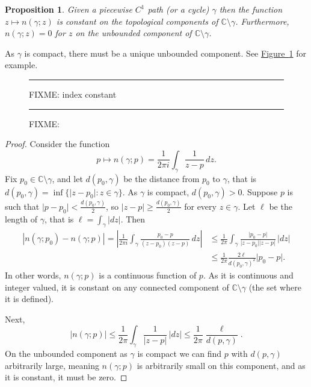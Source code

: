 \documentclass[12pt,openany]{book}
\newcommand{\sabs}[1]{\lvert {#1} \rvert}
\newcommand{\abs}[1]{\left\lvert {#1} \right\rvert}
\newcommand{\C}{{\mathbb{C}}}
\theoremstyle{plain}
\newtheorem{prop}[thm]{Proposition}
\theoremstyle{remark}
\theoremstyle{definition}
\newenvironment{myfig}{%
\begin{figure}[h!t]
\noindent\rule{\textwidth}{0.4pt}\vspace{12pt}\par\centering}%
{\par\noindent\rule{\textwidth}{0.4pt}
\end{figure}}
\theoremstyle{exercise}
\theoremstyle{example}
\newcommand{\figureref}[1]{\hyperref[#1]{Figure~\ref*{#1}}}
\begin{document}
\begin{prop}
Given a piecewise $C^1$ path (or a cycle) $\gamma$ then
the function $z \mapsto n(\gamma;z)$ is constant on the
topological components of $\C \setminus \gamma$.
Furthermore, $n(\gamma;z) = 0$ for $z$ on the unbounded component
of $\C \setminus \gamma$.
\end{prop}

As $\gamma$ is compact, there must be a unique unbounded component.
See \figureref{fig:indexconstant} for example.

\begin{myfig}
FIXME: index constant
\caption{FIXME:\label{fig:indexconstant}}
\end{myfig}

\begin{proof}
Consider the function
\begin{equation}
p \mapsto n(\gamma;p) = \frac{1}{2\pi i} \int_\gamma \frac{1}{z-p} \, dz .
\end{equation}
Fix $p_0 \in \C \setminus \gamma$, and let $d(p_0,\gamma)$ be the distance from 
$p_0$ to $\gamma$, that is $d(p_0,\gamma) = \inf \{ \sabs{z-p_0} : z \in
\gamma \}$.
As $\gamma$ is compact, $d(p_0,\gamma) > 0$.  Suppose $p$ is
such that $\sabs{p-p_0} < \frac{d(p_0,\gamma)}{2}$, so $\sabs{z-p} \geq
\frac{d(p_0,\gamma)}{2}$ for every $z \in \gamma$.  Let $\ell$ be the length of
$\gamma$, that is $\ell = \int_\gamma \sabs{dz}$.  Then
\begin{equation*}
\begin{split}
\abs{n(\gamma;p_0)-n(\gamma;p)}
=
\abs{\frac{1}{2\pi i} \int_\gamma \frac{p_0-p}{(z-p_0)(z-p)} \, dz}
& \leq
\frac{1}{2\pi} \int_\gamma \frac{\sabs{p_0-p}}{\sabs{z-p_0}\sabs{z-p}} \, \sabs{dz}
\\
& \leq 
\frac{1}{2\pi} \frac{2\ell}{{d(p_0,\gamma)}^2} \sabs{p_0-p} .
\end{split}
\end{equation*}
In other words, $n(\gamma;p)$ is a continuous function of $p$.
As it is continuous
and integer valued, it is constant on any connected component of
$\C \setminus \gamma$ (the set where it is defined).

Next,
\begin{equation*}
\sabs{n(\gamma;p)} \leq \frac{1}{2\pi} \int_\gamma \frac{1}{\sabs{z-p}} \,
\sabs{dz} \leq \frac{1}{2\pi} \frac{\ell}{d(p,\gamma)} .
\end{equation*}
On the unbounded component as $\gamma$ is compact we can find $p$
with $d(p,\gamma)$ arbitrarily large, meaning $n(\gamma;p)$ is arbitrarily small
on this component, and as it is constant, it must be zero.
\end{proof}
\end{document}
